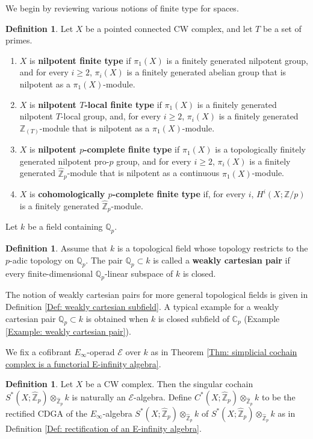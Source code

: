 \documentclass[11pt]{amsart}
\theoremstyle{definition}
\newtheorem{definition}[theorem]{Definition}
\numberwithin{equation}{section}
\numberwithin{equation}{section}
\newcommand\QQ{\mathbb{Q}}
\newcommand\CC{\mathbb{C}}
\newcommand\ZZ{\mathbb{Z}}
\begin{document}
We begin by reviewing various notions of finite type for spaces.

\begin{definition}\label{Def: finite type spaces}
Let $X$ be a pointed connected CW complex, and let $T$ be a set of primes.
\begin{enumerate}[leftmargin=0.25in]
    \item $X$ is \textbf{nilpotent finite type} if $\pi_1(X)$ is a finitely generated nilpotent group, and for every $i\geq 2$, $\pi_i(X)$ is a finitely generated abelian group that is nilpotent as a $\pi_1(X)$-module.
    \item $X$ is \textbf{nilpotent $T$-local finite type} if $\pi_1(X)$ is a finitely generated nilpotent $T$-local group, and, for every $i\geq 2$, $\pi_i(X)$ is a finitely generated $\ZZ_{(T)}$-module that is nilpotent as a $\pi_1(X)$-module.
    \item $X$ is \textbf{nilpotent $p$-complete finite type} if $\pi_1(X)$ is a topologically finitely generated nilpotent pro-$p$ group, and for every $i\geq 2$, $\pi_i(X)$ is a finitely generated $\widehat{\ZZ}_p$-module that is nilpotent as a continuous $\pi_1(X)$-module.
    \item $X$ is \textbf{cohomologically $p$-complete finite type} if, for every $i$, $H^i(X;\ZZ/p)$ is a finitely generated $\widehat{\ZZ}_p$-module.
\end{enumerate}
\end{definition}

Let $k$ be a field containing $\QQ_p$. 

\begin{definition}
Assume that $k$ is a topological field whose topology restricts to the $p$-adic topology on $\QQ_p$. The pair $\QQ_p\subset k$ is called a \textbf{weakly cartesian pair} if every finite-dimensional $\QQ_p$-linear subspace of $k$ is closed.
\end{definition}

The notion of weakly cartesian pairs for more general topological fields is given in Definition \ref{Def: weakly cartesian subfield}. A typical example for a weakly cartesian pair $\QQ_p\subset k$ is obtained when $k$ is closed subfield of $\CC_p$ (Example \ref{Example: weakly cartesian pair}).

We fix a cofibrant $E_{\infty}$-operad $\mathcal{E}$ over $k$ as in Theorem \ref{Thm: simplicial cochain complex is a functorial E-infinity algebra}.

\begin{definition}\label{Def: rectified CDGA}
Let $X$ be a CW complex. Then the singular cochain $S^*(X;\widehat{\ZZ}_p)\otimes_{\widehat{\ZZ}_p} k$ is naturally an $\mathcal{E}$-algebra. Define $
C^{*}(X;\widehat{\ZZ}_{p})\otimes_{\widehat{\ZZ}_{p}} k
$ to be the rectified CDGA of the $E_{\infty}$-algebra $S^*(X;\widehat{\ZZ}_p)\otimes_{\widehat{\ZZ}_p} k$ of $S^*(X;\widehat{\ZZ}_p)\otimes_{\widehat{\ZZ}_p} k$ as in Definition \ref{Def: rectification of an E-infinity algebra}.
\end{definition}
\end{document}

